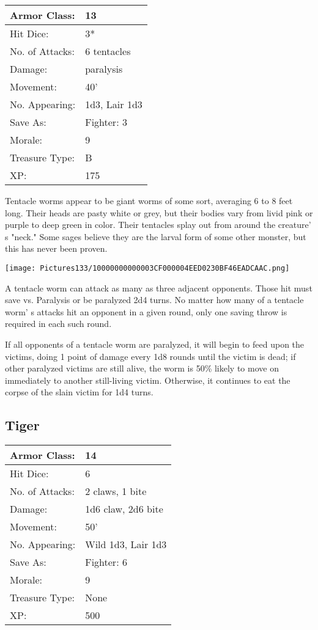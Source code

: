 \documentclass[a4paper,twoside,openany,10pt]{book}
\begin{document}
\begin{multicols}{2}
\begin{tabularx}{0.50\textwidth}{@{}lX@{}}
Armor Class: & 13 \\\hline
Hit Dice: & 3* \\\hline
No. of Attacks: & 6 tentacles \\\hline
Damage: & paralysis \\\hline
Movement: & 40' \\\hline
No. Appearing: & 1d3, Lair 1d3 \\\hline
Save As: & Fighter: 3 \\\hline
Morale: & 9 \\\hline
Treasure Type: & B \\\hline
XP: & 175 \\\hline
\end{tabularx}\medskip

Tentacle worms appear to be giant worms of some sort, averaging 6 to 8 feet long. Their heads are pasty white or grey, but their bodies vary from livid pink or purple to deep green in color. Their tentacles splay out from around the creature' s "neck." Some sages believe they are the larval form of some other monster, but this has never been proven.\medskip

\texttt{[image: Pictures133/10000000000003CF000004EED0230BF46EADCAAC.png]}

A tentacle worm can attack as many as three adjacent opponents. Those hit must save vs. Paralysis or be paralyzed 2d4 turns. No matter how many of a tentacle worm' s attacks hit an opponent in a given round, only one saving throw is required in each such round.

If all opponents of a tentacle worm are paralyzed, it will begin to feed upon the victims, doing 1 point of damage every 1d8 rounds until the victim is dead; if other paralyzed victims are still alive, the worm is 50\% likely to move on immediately to another still-living victim. Otherwise, it continues to eat the corpse of the slain victim for 1d4 turns.

\subsection*{Tiger}\label{tiger}

\begin{tabularx}{0.50\textwidth}{@{}lX@{}}
Armor Class: & 14 \\\hline
Hit Dice: & 6 \\\hline
No. of Attacks: & 2 claws, 1 bite \\\hline
Damage: & 1d6 claw, 2d6 bite \\\hline
Movement: & 50' \\\hline
No. Appearing: & Wild 1d3, Lair 1d3 \\\hline
Save As: & Fighter: 6 \\\hline
Morale: & 9 \\\hline
Treasure Type: & None \\\hline
XP: & 500 \\\hline
\end{tabularx}\medskip



\end{multicols}
\end{document}
